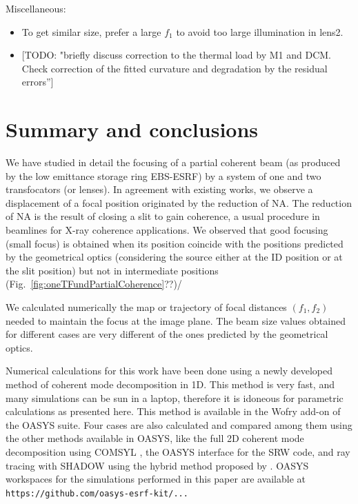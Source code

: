 \documentclass{iucr}              %
\newcommand{\todo}[1]{{\color{red}[TODO: "#1'']}}
\begin{document}
Miscellaneous: 
\begin{itemize}
    \item To get similar size, prefer a large $f_1$ to avoid too large illumination in lens2. 
    \item \todo{briefly discuss correction to the thermal load by M1 and DCM. Check correction of the fitted curvature and degradation by the residual errors}
\end{itemize}

\section{Summary and conclusions}
\label{sec:summary}

We have studied in detail the focusing of a partial coherent beam (as produced by the low emittance storage ring EBS-ESRF) by a system of one and two transfocators (or lenses). In agreement with existing works, we observe a displacement of a focal position originated by the reduction of NA. The reduction of NA is the result of closing a slit to gain coherence, a usual procedure in beamlines for X-ray coherence applications. We observed that good focusing (small focus) is obtained when its position coincide with the positions predicted by the geometrical optics (considering the source either at the ID position or at the slit position) but not in intermediate positions (Fig.~\ref{fig:oneTFundPartialCoherence}??)/

We calculated numerically the map or trajectory of focal distances $(f_1,f_2)$ needed to maintain the focus at the image plane. The beam size values obtained for different cases are very different of the ones predicted by the geometrical optics.  

Numerical calculations for this work have been done using a newly developed method of coherent mode decomposition in 1D. This method is very fast, and many simulations can be sun in a laptop, therefore it is idoneous for parametric calculations as presented here. This method is available in the Wofry add-on of the OASYS\cite{codeOASYS} suite. Four cases are also calculated and compared among them using the other methods available in OASYS, like the full 2D coherent mode decomposition using COMSYL \cite{codeCOMSYL}, the OASYS interface for the SRW \cite{codeSRW} code, and ray tracing with SHADOW\cite{codeSHADOW} using the hybrid method proposed by \cite{codeHYBRID}. OASYS workspaces for the simulations performed in this paper are available at {\tt https://github.com/oasys-esrf-kit/...} 
\end{document}

